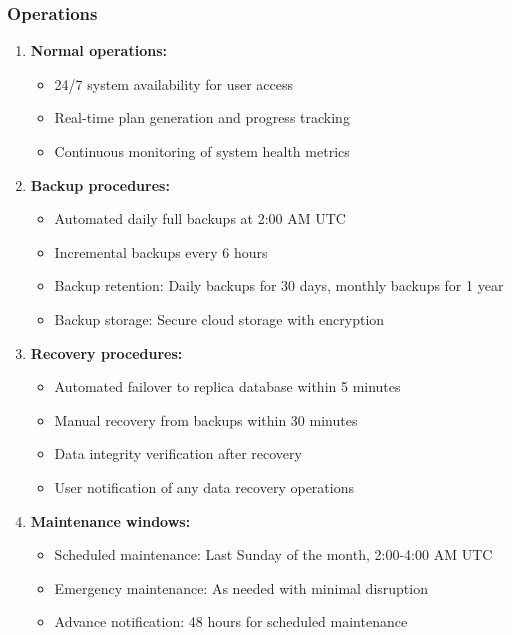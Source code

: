 \documentclass[12pt,a4paper]{article}
\begin{document}
\subsubsection{Operations}
\begin{enumerate}
    \item \textbf{Normal operations:}
    \begin{itemize}
        \item 24/7 system availability for user access
        \item Real-time plan generation and progress tracking
        \item Continuous monitoring of system health metrics
    \end{itemize}
    
    \item \textbf{Backup procedures:}
    \begin{itemize}
        \item Automated daily full backups at 2:00 AM UTC
        \item Incremental backups every 6 hours
        \item Backup retention: Daily backups for 30 days, monthly backups for 1 year
        \item Backup storage: Secure cloud storage with encryption
    \end{itemize}
    
    \item \textbf{Recovery procedures:}
    \begin{itemize}
        \item Automated failover to replica database within 5 minutes
        \item Manual recovery from backups within 30 minutes
        \item Data integrity verification after recovery
        \item User notification of any data recovery operations
    \end{itemize}
    
    \item \textbf{Maintenance windows:}
    \begin{itemize}
        \item Scheduled maintenance: Last Sunday of the month, 2:00-4:00 AM UTC
        \item Emergency maintenance: As needed with minimal disruption
        \item Advance notification: 48 hours for scheduled maintenance
    \end{itemize}
\end{enumerate}
\end{document}

